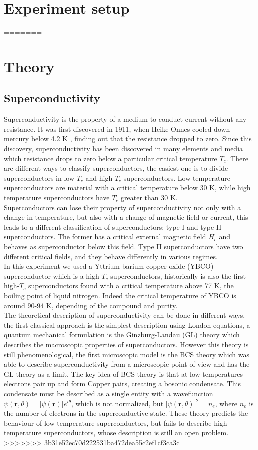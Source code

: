 \documentclass[a4paper,10pt]{article}
\begin{document}
\section{Experiment setup}
=======
\section{Theory}
\subsection{Superconductivity}
Superconductivity is the property of a medium to conduct current without any resistance. It was first discovered in 1911, when Heike Onnes cooled down mercury below 4.2 K \cite{firstsuperconductor}, finding out that the resistance dropped to zero. Since this discovery, superconductivity has been discovered in many elements and media which resistance drops to zero below a particular critical temperature $T_c$. There are different ways to classify superconductors, the easiest one is to divide superconductors in low-$T_c$ and high-$T_c$ superconductors. Low temperature superconductors are material with a critical temperature below $30$ K, while high temperature superconductors have $T_c$ greater than 30 K.\\
Superconductors can lose their property of superconductivity not only with a change in temperature, but also with a change of magnetic field or current, this leads to a different classification of superconductors: type I and type II superconductors. The former has a critical external magnetic field $H_c$ and behaves as superconductor below this field. Type II superconductors have two different critical fields, and they behave differently in various regimes.\\
In this experiment we used a Yttrium barium copper oxide (YBCO) superconductor which is a high-$T_c$ superconductors, historically is also the first high-$T_c$ superconductors found with a critical temperature above 77 K, the boiling point of liquid nitrogen. Indeed the critical temperature of YBCO is around 90-94 K, depending of the compound and purity.\\
The theoretical description of superconductivity can be done in different ways, the first classical approach is the simplest description using London equations, a quantum mechanical formulation is the Ginzburg-Landau (GL) theory which describes the macroscopic properties of superconductors. However this theory is still phenomenological, the first microscopic model is the BCS theory which was able to describe superconductivity from a microscopic point of view and has the GL theory as a limit. The key idea of BCS theory is that at low temperatures electrons pair up and form Copper pairs, creating a bosonic condensate. This condensate must be described as a single entity with a wavefunction $\psi(\mathbf{r},\theta) = |\psi(\mathbf{r})| e^{i\theta}$, which is not normalized, but $|\psi(\mathbf{r},\theta)|^2 = n_e$, where $n_e$ is the number of electrons in the superconductive state. These theory predicts the behaviour of low temperature superconductors, but fails to describe high temperature superconductors, whose description is still an open problem.
>>>>>>> 3b31e52ec70d222531ba472dea55c2ef1cf3ca3c
\end{document}
